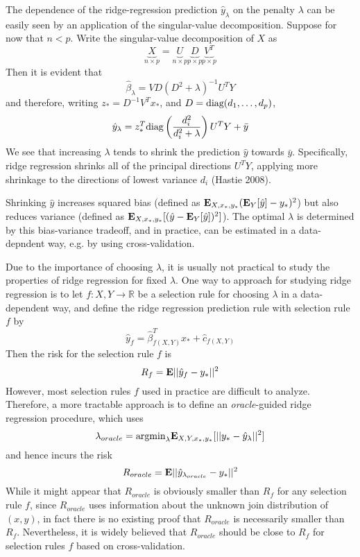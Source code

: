 \documentclass[11pt]{article}
\begin{document}
The dependence of the ridge-regression prediction
$\hat{y}_\lambda$ on the penalty $\lambda$ can be easily seen by
an application of the singular-value decomposition.
Suppose for now that $n < p$.
Write the singular-value decomposition of $X$ as
\[
\underbrace{X}_{n \times p} = \underbrace{U}_{n \times p}\underbrace{D}_{p \times p}\underbrace{V^T}_{p \times p}
\]
Then it is evident that
\[
\hat{\beta}_\lambda = V D (D^2 + \lambda)^{-1} U^T Y
\]
and therefore, writing $z_* = D^{-1} V^T x_*$, and $D = \text{diag}(d_1,\hdots, d_p)$,
\[
\hat{y}_\lambda = z_*^T \text{diag}\left(\frac{d_i^2}{d_i^2 + \lambda}\right) U^T Y + \bar{y}
\]
We see that increasing $\lambda$ tends to shrink the prediction
$\hat{y}$ towards $\bar{y}$.  Specifically, ridge regression shrinks
all of the principal directions $U^T Y$, applying more shrinkage to
the directions of lowest variance $d_i$ (Hastie 2008).

Shrinking $\hat{y}$ increases squared
bias (defined as $\textbf{E}_{X, x_*, y_*}(\textbf{E}_{Y}[\hat{y}] - y_*)^2$) but also reduces
variance (defined as $\textbf{E}_{X, x_*, y_*}[(\hat{y} - \textbf{E}_{Y}[\hat{y}])^2]$).  The
optimal $\lambda$ is determined by this bias-variance tradeoff, and in
practice, can be estimated in a data-depndent way, e.g. by using
cross-validation.

Due to the importance of choosing $\lambda$, it is usually not
practical to study the properties of ridge regression for fixed
$\lambda$.  One way to approach for studying ridge regression is
to let $f: X, Y \to \mathbb{R} $ be a selection rule for choosing
$\lambda$ in a data-dependent way, and define the ridge regression
prediction rule with selection rule $f$ by
\[
\hat{y}_f = \hat{\beta}_{f(X, Y)}^T x_* + \hat{c}_{f(X, Y)}
\]
Then the risk for the selection rule $f$ is
\[
R_f = \textbf{E}||\hat{y}_f - y_*||^2
\]
However, most selection rules $f$ used in practice are difficult to
analyze.  Therefore, a more tractable approach is to define an \emph{oracle}-guided ridge regression procedure, which uses
\[
\lambda_{oracle} = \text{argmin}_{\lambda} \textbf{E}_{X, Y, x_*, y_*}[||y_* - \hat{y}_\lambda||^2]
\]
and hence incurs the risk
\[
R_{oracle} = \textbf{E}||\hat{y}_{\lambda_{oracle}} - y_*||^2
\]
While it might appear that $R_{oracle}$ is obviously smaller than
$R_f$ for any selection rule $f$, since $R_{oracle}$ uses information
about the unknown join distribution of $(x,y)$, in fact there is no
existing proof that $R_{oracle}$ is necessarily smaller than $R_f$.
Nevertheless, it is widely believed that $R_{oracle}$ should be close
to $R_f$ for selection rules $f$ based on cross-validation.
\end{document}

